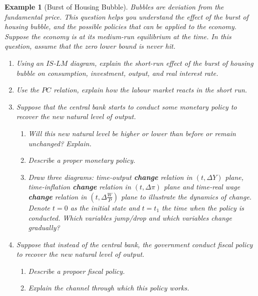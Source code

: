 \documentclass[12pt]{article}
\newtheorem{example}{Example}
\begin{document}
\begin{example}[Burst of Housing Bubble]
  Bubbles are deviation from the fundamental price. This question helps you understand the effect of the burst of housing bubble, and the possible policies that can be applied to the economy. Suppose the economy is at its medium-run equilibrium at the time. In this question, assume that the zero lower bound is never hit.
  \begin{enumerate}[label=(\arabic*)]
    \item Using an $IS$-$LM$ diagram, explain the short-run effect of the burst of housing bubble on consumption, investment, output, and real interest rate.
    \vspace{80pt}
    \newpage
    \item Use the $PC$ relation, explain how the labour market reacts in the short run. 
    \vspace{80pt}
    \item Suppose that the central bank starts to conduct some monetary policy to recover the new natural level of output.
    \begin{enumerate}[label=\alph*.]
      \item Will this new natural level be higher or lower than before or remain unchanged? Explain.
      \vspace{80pt}
      \item Describe a proper monetary policy.
      \vspace{80pt}
      \item Draw three diagrams: time-output \textbf{change} relation in $(t, \Delta Y)$ plane, time-inflation \textbf{change}  relation in $(t, \Delta \pi)$ plane and time-real wage \textbf{change}  relation in $(t, \Delta \frac{W}{P})$ plane to illustrate the dynamics of change. Denote $t=0$ as the initial state and $t=t_1$ the time when the policy is conducted. Which variables jump/drop and which variables change gradually?
    \end{enumerate}
    \vspace{120pt}
    \newpage
    \item Suppose that instead of the central bank, the government conduct fiscal policy to recover the new natural level of output. 
    \begin{enumerate}
      \item Describe a propoer fiscal policy.
      \vspace{80pt}
      \item Explain the channel through which this policy works.
      \vspace{80pt}
    \end{enumerate}
  \end{enumerate}
\end{example}
\end{document}
